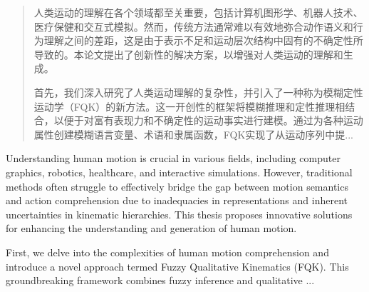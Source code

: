 %
%
%
%




\begin{abstract}
人类运动的理解在各个领域都至关重要，包括计算机图形学、机器人技术、医疗保健和交互式模拟。然而，传统方法通常难以有效地弥合动作语义和行为理解之间的差距，这是由于表示不足和运动层次结构中固有的不确定性所导致的。本论文提出了创新性的解决方案，以增强对人类运动的理解和生成。

首先，我们深入研究了人类运动理解的复杂性，并引入了一种称为模糊定性运动学（FQK）的新方法。这一开创性的框架将模糊推理和定性推理相结合，以便于对富有表现力和不确定性的运动事实进行建模。通过为各种运动属性创建模糊语言变量、术语和隶属函数，FQK实现了从运动序列中提...
\end{abstract}

\begin{abstractEn}
Understanding human motion is crucial in various fields, including computer graphics, robotics, healthcare, and interactive simulations. However, traditional methods often struggle to effectively bridge the gap between motion semantics and action comprehension due to inadequacies in representations and inherent uncertainties in kinematic hierarchies. This thesis proposes innovative solutions for enhancing the understanding and generation of human motion.

First, we delve into the complexities of human motion comprehension and introduce a novel approach termed Fuzzy Qualitative Kinematics (FQK). This groundbreaking framework combines fuzzy inference and qualitative ...
\end{abstractEn}
